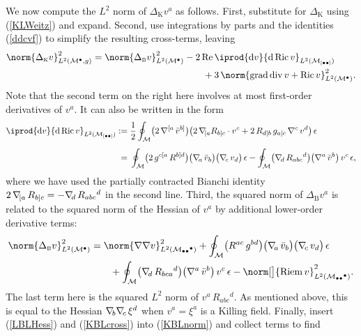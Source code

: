 \documentclass[12pt,letterpaper]{iopart}
\newcommand\Lap[1][K]{\Delta_{\scriptscriptstyle\mathrm{#1}}}
\newcommand\M{\mathcal{M}}
\newcommand\ind{{\bullet}}
\DeclareMathOperator\Ric{Ric}
\DeclareMathOperator\Riem{Riem}
\begin{document}
We now compute the $L^2$ norm of $\Lap v^a$ as follows.  First, substitute for $\Lap$ using (\ref{KLWeitz}) and expand.  Second, use integrations by parts and the identities (\ref{ddcvf}) to simplify the resulting cross-terms, leaving 
%
\begin{align}\label{KBLnorm}
	\norm{\Lap v}^2_{L^2(\M^\ind, g)}
		= \norm{\Lap[B] v}^2_{L^2(\M^\ind)} 
			&- 2 \real \iprod{\ed v}{\ed \Ric v}_{L^2(\M_{[\ind\ind]})}
			\notag\\&\hspace{2em}
			+ 3\, \norm{\Grad \Div v + \Ric v}^2_{L^2(\M^\ind)}.
\end{align}
%
Note that the second term on the right here involves at most first-order derivatives of $v^a$.  It can also be written in the form 
%
\begin{align}\label{KBLcross}
	\iprod{\ed v}{\ed \Ric v}_{L^2(\M_{[\ind\ind]})}
		:={}&{} \frac{1}{2} \oint_\M \bigl( 2\, \grad^{[a}\, \bar v^{b]} \bigr) 
			\bigl( 2\, \grad\!_{[a} R_{b]c} \cdot v^c + 2\, R_{d[b}\, g_{a] c}\, \grad^c\, v^d \bigr)\, \epsilon
			\\[1ex]\notag
		={}&{} \oint_\M \bigl( 2\, g^{c [a}\, R^{b] d} \bigr) 
			\bigl( \grad\!_a\, \bar v_b \bigr) \bigl( \grad\!_c\, v_d \bigr)\, \epsilon
		- \oint_\M \bigl( \grad\!_d\, R_{abc}{}^d \bigr) \bigl( \grad^a\, \bar v^b \bigr)\, v^c\, \epsilon, 
\end{align}
%
where we have used the partially contracted Bianchi identity $2\, \nabla\!_{[a}\, R_{b]c} = - \nabla\!_d\, R_{abc}{}^d$
in the second line.  Third, the squared norm of $\Lap[B] v^a$ is related to the squared norm of the Hessian of $v^a$ by additional lower-order derivative terms: 
%
\begin{align}\label{LBLHess}
	\norm{\Lap[B] v}^2_{L^2(\M^\ind)}
		&= \norm{\grad \grad v}^2_{L^2(\M_{\ind\ind}{}^\ind)}
			+ \oint_\M \bigl( R^{ac}\, g^{bd} \bigr) 
				\bigl( \grad\!_a\, \bar v_b \bigr) \bigl( \grad\!_c\, v_d \bigr)\, \epsilon
			\notag\\&\hspace{2em}
			+ \oint_\M \bigl( \grad\!_d\, R_{bca}{}^d \bigr) \bigl( \grad^a\, \bar v^b \bigr)\, v^c\, \epsilon
			- \norm[\big]{\Riem v}^2_{L^2(\M_{\ind\ind}{}^\ind)}.
\end{align}
%
The last term here is the squared $L^2$ norm of $v^a\, R_{abc}{}^d$.  As mentioned above, this is equal to the Hessian $\nabla\!_b \nabla\!_c\, \xi^d$ when $v^a = \xi^a$ is a Killing field.  Finally, insert (\ref{LBLHess}) and (\ref{KBLcross}) into (\ref{KBLnorm}) and collect terms to find 
\end{document}
